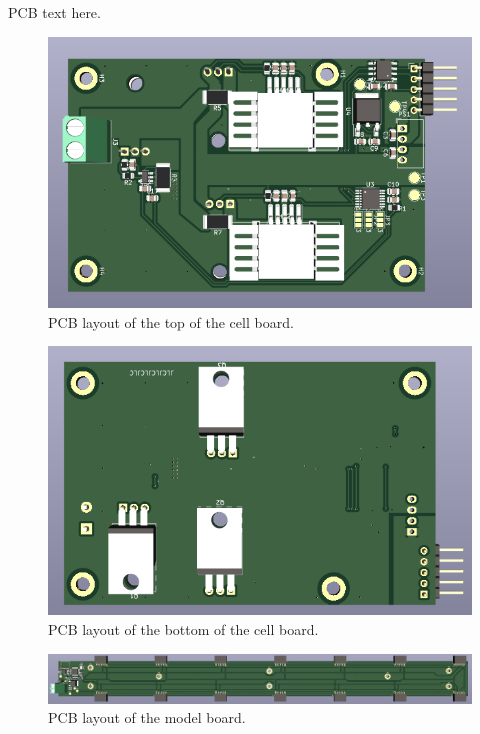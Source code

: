 PCB text here.

\begin{figure}[h]
    \centering
    \includegraphics[scale=0.5]{pcb_cell_board_top.png}
    \caption{PCB layout of the top of the cell board.}
\end{figure}

\begin{figure}[h]
    \centering
    \includegraphics[scale=0.5]{pcb_cell_board_bottom.png}
    \caption{PCB layout of the bottom of the cell board.}
\end{figure}

\begin{figure}[h]
    \centering
    \includegraphics[scale=0.27]{pcb_model_board_top.png}
    \caption{PCB layout of the model board.}
\end{figure}
